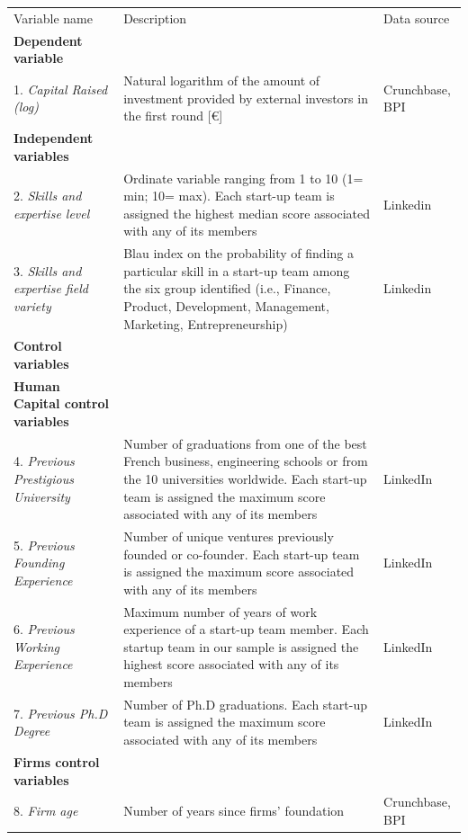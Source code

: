 \documentclass[12pt]{article}
\begin{document}

\begin{table} [ht]
\scriptsize
\renewcommand{\arraystretch}{1.5}
\begin{tabularx}{\textwidth}{ p{5cm} p{7cm} p{2.2cm} }
\toprule
\multicolumn{1}{l}{Variable name}&\multicolumn{1}{l}{Description}&\multicolumn{1}{l}{Data source}\\
\cmidrule(r){1-3}
\textbf{Dependent variable}& &\\
1. \textit{Capital Raised (log)} & Natural logarithm of the amount of investment provided by external investors in the first round [€] & Crunchbase, BPI \\
\cmidrule(r){2-3}
\textbf{Independent variables}& &\\
2. \textit{Skills and expertise level} & Ordinate variable ranging from 1 to 10 (1= min; 10= max). Each start-up team is assigned the highest median score associated with any of its members & Linkedin\\
3. \textit{Skills and expertise field variety} & Blau index on the probability of finding a particular skill in a start-up team among the six group identified (i.e., Finance, Product, Development, Management, Marketing, Entrepreneurship) & Linkedin \\
\cmidrule(r){2-3}
\textbf{Control variables}& &\\
\textbf{Human Capital control variables}& &\\
4. \textit{Previous Prestigious University} & Number of graduations from one of the best French business, engineering schools or from the 10 universities worldwide. Each start-up team is assigned the maximum score associated with any of its members & LinkedIn\\
5. \textit{Previous Founding Experience} & Number of unique ventures previously founded or co-founder. Each start-up team is assigned the maximum score associated with any of its members & LinkedIn\\
6. \textit{Previous Working Experience} & Maximum number of years of work experience of a start-up team member. Each startup team in our sample is assigned the highest score associated with any of its members & LinkedIn\\
7. \textit{Previous Ph.D Degree} & Number of Ph.D graduations. Each start-up team is assigned the maximum score associated with any of its members & LinkedIn\\
\textbf{Firms control variables}& &\\
8. \textit{Firm age} & Number of years since firms' foundation & Crunchbase, BPI\\

\end{tabularx}
\end{table}
\end{document}
